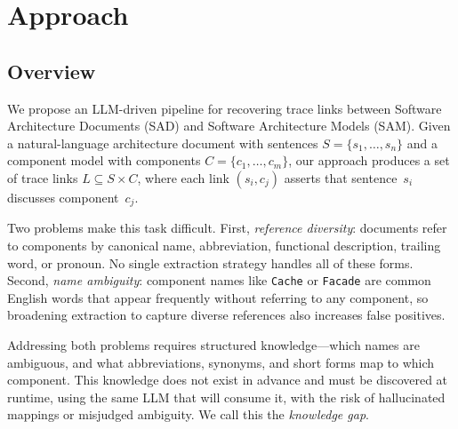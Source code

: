 %

\section{Approach}\label{sec:approach}

\subsection{Overview}\label{sec:overview}

We propose an LLM-driven pipeline for recovering trace links between
Software Architecture Documents (SAD) and Software Architecture Models
(SAM).
Given a natural-language architecture document with sentences
$S = \{s_1, \ldots, s_n\}$ and a component model with components
$C = \{c_1, \ldots, c_m\}$, our approach produces a set of trace links
$L \subseteq S \times C$, where each link $(s_i, c_j)$ asserts that
sentence~$s_i$ discusses component~$c_j$.

Two problems make this task difficult.
First, \emph{reference diversity}: documents refer to components by
canonical name, abbreviation, functional description, trailing word,
or pronoun.
No single extraction strategy handles all of these forms.
Second, \emph{name ambiguity}: component names like \texttt{Cache} or
\texttt{Facade} are common English words that appear frequently
without referring to any component, so broadening extraction to
capture diverse references also increases false positives.

Addressing both problems requires structured knowledge---which names
are ambiguous, and what abbreviations, synonyms, and short forms map
to which component.
This knowledge does not exist in advance and must be discovered at
runtime, using the same LLM that will consume it, with the risk of
hallucinated mappings or misjudged ambiguity.
We call this the \emph{knowledge gap}.

